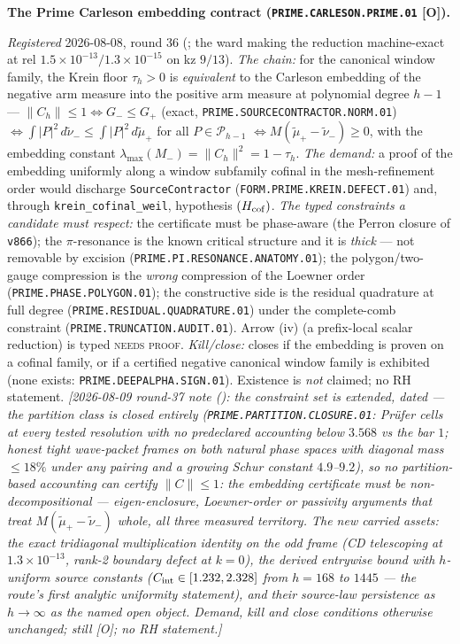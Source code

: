 \documentclass[11pt,a4paper]{article}
\begin{document}
\par\smallskip\noindent\textbf{The Prime Carleson embedding
contract (\texttt{PRIME.CARLESON.PRIME.01} [O]).}
{\sloppy
\emph{Registered} 2026-08-08, round 36
(; the ward making the
reduction machine-exact at rel
$1.5\times10^{-13}/1.3\times10^{-15}$ on kz $9/13$).
\emph{The chain:} for the canonical window family, the Krein
floor $\tau_h > 0$ is \emph{equivalent} to the Carleson
embedding of the negative arm measure into the positive arm
measure at polynomial degree $h - 1$ --- $\|C_h\| \le 1
\Leftrightarrow G_- \le G_+$ (exact,
\texttt{PRIME.SOURCECONTRACTOR.NORM.01}) $\Leftrightarrow
\int|P|^2\,d\tilde\nu_- \le \int|P|^2\,d\tilde\mu_+$ for all
$P \in \mathcal P_{h-1}$ $\Leftrightarrow M(\tilde\mu_+ -
\tilde\nu_-) \ge 0$, with the embedding constant
$\lambda_{\max}(M_-) = \|C_h\|^2 = 1 - \tau_h$.  \emph{The
demand:} a proof of the embedding uniformly along a window
subfamily cofinal in the mesh-refinement order would discharge
\texttt{SourceContractor}
(\texttt{FORM.PRIME.KREIN.DEFECT.01}) and, through
\texttt{krein\_cofinal\_weil}, hypothesis $(H_{\rm cof})$.
\emph{The typed constraints a candidate must respect:} the
certificate must be phase-aware (the Perron closure of
\texttt{v866}); the $\pi$-resonance is the known critical
structure and it is \emph{thick} --- not removable by excision
(\texttt{PRIME.PI.RESONANCE.ANATOMY.01}); the polygon/two-gauge
compression is the \emph{wrong} compression of the Loewner
order (\texttt{PRIME.PHASE.POLYGON.01}); the constructive side
is the residual quadrature at full degree
(\texttt{PRIME.RESIDUAL.QUADRATURE.01}) under the complete-comb
constraint (\texttt{PRIME.TRUNCATION.AUDIT.01}).  Arrow (iv)
(a prefix-local scalar reduction) is typed \textsc{needs
proof}.  \emph{Kill/close:} closes if the embedding is proven
on a cofinal family, or if a certified negative canonical
window family is exhibited (none exists:
\texttt{PRIME.DEEPALPHA.SIGN.01}).  Existence is \emph{not}
claimed; no RH statement.
\emph{[2026-08-09 round-37 note
(): the constraint
set is extended, dated --- the partition class is closed
\emph{entirely} (\texttt{PRIME.PARTITION.CLOSURE.01}: Pr\"ufer
cells at every tested resolution with no predeclared accounting
below $3.568$ vs the bar $1$; honest tight wave-packet frames on
both natural phase spaces with diagonal mass $\le 18\%$ under any
pairing and a growing Schur constant $4.9$--$9.2$), so no
partition-based accounting can certify $\|C\| \le 1$: the
embedding certificate must be \emph{non-decompositional} ---
eigen-enclosure, Loewner-order or passivity arguments that treat
$M(\tilde\mu_+ - \tilde\nu_-)$ whole, all three measured
territory.  The new carried assets: the exact tridiagonal
multiplication identity on the odd frame (CD telescoping at
$1.3\times10^{-13}$, rank-2 boundary defect at $k = 0$), the
derived entrywise bound with $h$-uniform source constants
($C_{\rm int} \in [1.232, 2.328]$ from $h = 168$ to $1445$ ---
the route's first analytic uniformity statement), and their
source-law persistence as $h \to \infty$ as the named open
object.  Demand, kill and close conditions otherwise unchanged;
still [O]; no RH statement.]}\par}
\end{document}
